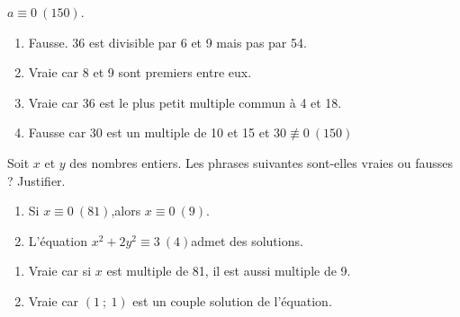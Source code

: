 \begin{autoeval}
\begin{multicols}{2}
\begin{exercice}
\begin{enumerate}
	$a\equiv0~(150)$.
	\end{enumerate}
	\end{exercice}
	\begin{corrige}
          \begin{enumerate}
          \item Fausse. 36 est divisible par 6 et 9 mais pas par 54.
          \item Vraie car 8 et 9 sont premiers entre eux.
          \item Vraie car 36 est le plus petit multiple commun à 4 et
            18.
          \item Fausse car 30 est un multiple de 10 et 15 et
            \linebreak$30\not\equiv0~(150)$
          \end{enumerate}
	\end{corrige}
	
        \smallskip{}

	\begin{exercice}
          Soit $x$ et $y$ des nombres entiers. Les phrases suivantes sont-elles
          vraies ou fausses ? Justifier.
	\begin{enumerate}
	\item Si \enskip $x\equiv0~(81)$,\enskip alors \enskip
          $x\equiv0~(9)$.
	\item L'équation \enskip $x^2+2y^2\equiv3~(4)$\enskip admet
          des solutions.
	\end{enumerate}
	\end{exercice}
	\begin{corrige}
          \begin{enumerate}
          \item Vraie car si $x$ est multiple de 81, il est aussi
            multiple de 9.
          \item Vraie car $(1\ ;\ 1)$ est un couple solution de
            l'équation.
          \end{enumerate}
	\end{corrige}
	
        \smallskip{}


\end{multicols}
\end{autoeval}

